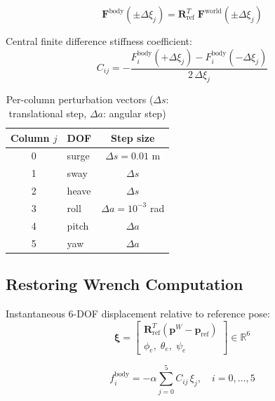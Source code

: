\documentclass[12pt,a4paper]{article}
\newcommand{\xivec}{\boldsymbol{\xi}}
\begin{document}
\begin{equation}
  \mathbf{F}^{\text{body}}(\pm\Delta\xi_j)
    = \mathbf{R}_{\text{ref}}^T\;\mathbf{F}^{\text{world}}(\pm\Delta\xi_j)
  \label{eq:stiffness_fd}
\end{equation}

Central finite difference stiffness coefficient:
\begin{equation}
  \boxed{
  C_{ij} = -\frac{F_i^{\text{body}}(+\Delta\xi_j)
             - F_i^{\text{body}}(-\Delta\xi_j)}{2\,\Delta\xi_j}
  }
  \label{eq:c_matrix}
\end{equation}

\begin{table}[H]
  \centering
  \caption{Per-column perturbation vectors ($\Delta s$: translational step,
           $\Delta a$: angular step)}
  \begin{tabular}{clc}
    \toprule
    \textbf{Column $j$} & \textbf{DOF} & \textbf{Step size} \\
    \midrule
    0 & surge  & $\Delta s = 0.01$ m \\
    1 & sway   & $\Delta s$ \\
    2 & heave  & $\Delta s$ \\
    3 & roll   & $\Delta a = 10^{-3}$ rad \\
    4 & pitch  & $\Delta a$ \\
    5 & yaw    & $\Delta a$ \\
    \bottomrule
  \end{tabular}
\end{table}

\subsection{Restoring Wrench Computation}

Instantaneous 6-DOF displacement relative to reference pose:
\begin{equation}
  \xivec =
  \begin{bmatrix}
    \mathbf{R}_{\text{ref}}^T(\mathbf{p}^W - \mathbf{p}_{\text{ref}}) \\[2pt]
    \phi_e,\;\theta_e,\;\psi_e
  \end{bmatrix} \in \mathbb{R}^6
  \label{eq:xi}
\end{equation}

\begin{equation}
  \boxed{
  f_i^{\text{body}} = -\alpha \sum_{j=0}^{5} C_{ij}\,\xi_j,
  \quad i=0,\ldots,5
  }
  \label{eq:restoring}
\end{equation}
\end{document}
